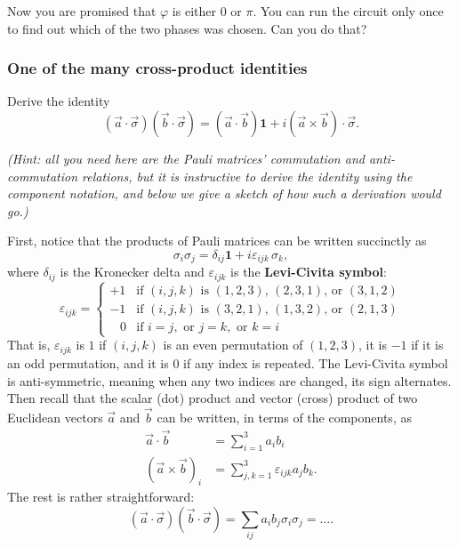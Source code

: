 \documentclass[fleqn]{article}
\begin{document}
Now you are promised that \(\varphi\) is either \(0\) or \(\pi\).
You can run the circuit only once to find out which of the two phases was chosen.
Can you do that?

\hypertarget{cross-product-identity}{%
\subsubsection{One of the many cross-product identities}\label{cross-product-identity}}

Derive the identity
\[
  (\vec{a}\cdot\vec{\sigma})(\vec{b}\cdot\vec{\sigma})
  = (\vec{a}\cdot\vec{b})\mathbf{1}+ i(\vec{a}\times \vec{b})\cdot \vec{\sigma}.
\]

\emph{(Hint: all you need here are the Pauli matrices' commutation and anti-commutation relations, but it is instructive to derive the identity using the component notation, and below we give a sketch of how such a derivation would go.)}

First, notice that the products of Pauli matrices can be written succinctly as
\[
 \sigma_{i}\sigma_{j}
 = \delta _{ij}\mathbf{1}+ i\varepsilon_{ijk}\,\sigma _{k},
\]
where \(\delta_{ij}\) is the Kronecker delta and \(\varepsilon_{ijk}\) is the \textbf{Levi-Civita symbol}:
\[
 \varepsilon_{ijk}
 = \begin{cases}
  +1 & {\text{if }}(i,j,k){\text{ is }}(1,2,3)\text{, }(2,3,1){\text{, or }}(3,1,2)
\\-1 & {\text{if }}(i,j,k){\text{ is }}(3,2,1)\text{, }(1,3,2){\text{, or }}(2,1,3)
\\\;\;\;0 & {\text{if }}i=j,{\text{ or }}j=k,{\text{ or }}k=i
\end{cases}
\]
That is, \(\varepsilon _{ijk}\) is \(1\) if \((i, j, k)\) is an even permutation of \((1, 2, 3)\), it is \(-1\) if it is an odd permutation, and it is \(0\) if any index is repeated.
The Levi-Civita symbol is anti-symmetric, meaning when any two indices are changed, its sign alternates.
Then recall that the scalar (dot) product and vector (cross) product of two Euclidean vectors \(\vec{a}\) and \(\vec{b}\) can be written, in terms of the components, as
\[
  \begin{aligned}
    \vec{a}\cdot\vec{b}
    &= \sum_{i=1}^3 a_i b_i
  \\(\vec{a}\times\vec{b})_i
    &= \sum_{j,k=1}^3 \varepsilon_{ijk}a_jb_k.
  \end{aligned}
\]
The rest is rather straightforward:
\[
  (\vec{a}\cdot\vec{\sigma})(\vec{b}\cdot\vec{\sigma})
  = \sum_{ij}a_i b_j\sigma_i\sigma_j
  = \ldots.
\]
\end{document}
